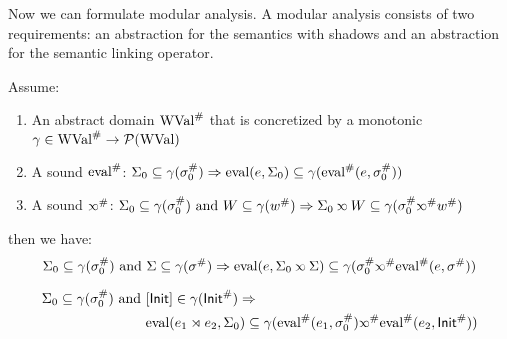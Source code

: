 Now we can formulate modular analysis.
A modular analysis consists of two requirements: an abstraction for the semantics with shadows and an abstraction for the semantic linking operator.
\begin{thm}
  Assume:
  \begin{enumerate}
    \item An abstract domain ${\text{WVal}}^{\#}$ that is concretized by a monotonic $\gamma\in{\text{WVal}}^{\#}\rightarrow\mathcal{P}({\text{WVal}})$
    \item A sound ${\text{eval}}^{\#}$: $\Sigma_0\subseteq\gamma({\sigma}^{\#}_0)\Rightarrow\text{eval}(e,\Sigma_0)\subseteq\gamma({\text{eval}}^{\#}(e,{\sigma}^{\#}_0))$
    \item A sound $\Abs\semlink$: $\Sigma_0\subseteq\gamma(\Abs\ctx_0)\text{ and }W\subseteq\gamma(\Abs{w})\Rightarrow\Sigma_0\semlink W\subseteq\gamma(\Abs\ctx_0\Abs\semlink\Abs{w})$
  \end{enumerate}
  then we have:
  \[\Sigma_0\subseteq\gamma(\Abs\ctx_0)\text{ and }\Sigma\subseteq\gamma(\Abs\ctx)\Rightarrow\eval(e,\Sigma_0\semlink\Sigma)\subseteq\gamma(\Abs\ctx_0\Abs\semlink\Abs\eval(e,\Abs\ctx))\]
\end{thm}
\begin{cor}
  \begin{align*}
    \Sigma_0\subseteq\gamma(\Abs\ctx_0)\text{ and } & [\InitE]\in\gamma(\Abs\InitE)\Rightarrow                                                                       \\
                                                    & \eval(e_1\synlink e_2,\Sigma_0)\subseteq\gamma(\Abs\eval(e_1,\Abs\ctx_0)\Abs\semlink\Abs\eval(e_2,\Abs\InitE))
  \end{align*}
\end{cor}
